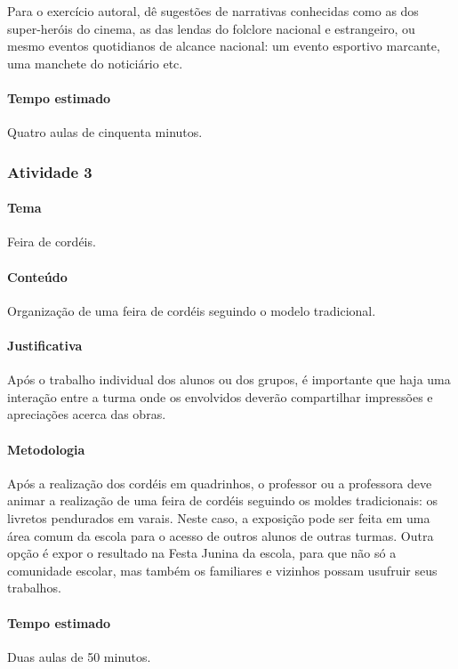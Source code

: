 \documentclass[11pt]{extarticle}
\begin{document}
Para o exercício autoral, dê sugestões de narrativas conhecidas como as 
dos super-heróis do cinema, as das lendas do folclore nacional e 
estrangeiro, ou mesmo eventos quotidianos de alcance nacional: 
um evento esportivo marcante, uma manchete do noticiário etc.

\paragraph{Tempo estimado} Quatro aulas de cinquenta minutos.


\subsubsection{Atividade 3}


\paragraph{Tema} Feira de cordéis.

\paragraph{Conteúdo} Organização de uma feira de cordéis seguindo o modelo tradicional.

\paragraph{Justificativa} Após o trabalho individual dos alunos ou dos grupos,
é importante que haja uma interação entre a turma onde os envolvidos
deverão compartilhar impressões e apreciações acerca das obras.

\paragraph{Metodologia} Após a realização dos cordéis em quadrinhos,
 o professor ou a professora deve animar a realização de uma feira de cordéis 
  seguindo os moldes tradicionais: os livretos pendurados em varais.
 Neste caso, a exposição pode ser feita em uma área comum da escola para o acesso de outros alunos
 de outras turmas. Outra opção é expor o resultado na Festa Junina da escola, para que não só a comunidade
 escolar, mas também os familiares e vizinhos possam usufruir seus trabalhos.


\paragraph{Tempo estimado} Duas aulas de 50 minutos.
 
\end{document}
